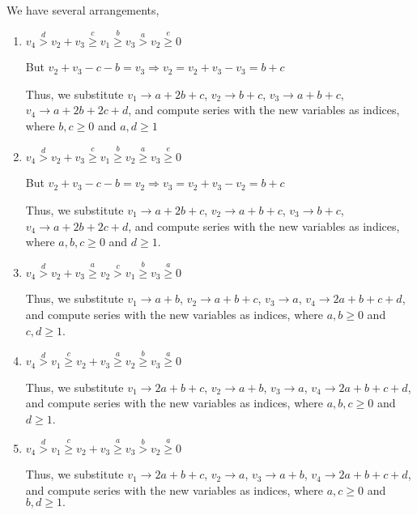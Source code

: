\documentclass{article}
\begin{document}
We have several arrangements,
\begin{enumerate}
\item 
$v_4\overset{d}{>}v_2+v_3\overset{c}{\geq}v_1\overset{b}{\geq}{v_3}\overset{a}{>}v_2\overset{e}{\geq}{0}$

But $v_2+v_3-c-b=v_3\Rightarrow{v_2=v_2+v_3-v_3=b+c}$

Thus, we substitute 
$v_1\rightarrow{a+2b+c}$, 
$v_2\rightarrow{b+c}$, 
$v_3\rightarrow{a+b+c}$, 
$v_4\rightarrow{a+2b+2c+d}$, and compute series with the new variables as indices, where $b,c\geq{0}$ and $a,d\geq{1}$

\item 
$v_4\overset{d}{>}v_2+v_3\overset{c}{\geq}v_1\overset{b}{\geq}{v_2}\overset{a}{\geq}v_3\overset{e}{\geq}{0}$

But $v_2+v_3-c-b=v_2\Rightarrow{v_3=v_2+v_3-v_2=b+c}$

Thus, we substitute 
$v_1\rightarrow{a+2b+c}$, 
$v_2\rightarrow{a+b+c}$, 
$v_3\rightarrow{b+c}$, 
$v_4\rightarrow{a+2b+2c+d}$, and compute series with the new variables as indices, where $a,b,c\geq{0}$ and $d\geq{1}$.
\item 
$v_4\overset{d}{>}v_2+v_3\overset{a}{\geq}v_2\overset{c}{>}{v_1}\overset{b}{\geq}v_3\overset{a}{\geq}{0}$


Thus, we substitute 
$v_1\rightarrow{a+b}$, 
$v_2\rightarrow{a+b+c}$, 
$v_3\rightarrow{a}$, 
$v_4\rightarrow{2a+b+c+d}$, and compute series with the new variables as indices, where $a,b\geq{0}$ and $c,d\geq{1}$.

\item 
$v_4\overset{d}{>}v_1\overset{c}{\geq}v_2+v_3\overset{a}{\geq}{v_2}\overset{b}{\geq}v_3\overset{a}{\geq}{0}$

Thus, we substitute 
$v_1\rightarrow{2a+b+c}$, 
$v_2\rightarrow{a+b}$, 
$v_3\rightarrow{a}$, 
$v_4\rightarrow{2a+b+c+d}$, and compute series with the new variables as indices, where $a,b,c\geq{0}$ and $d\geq{1}$.

\item 
$v_4\overset{d}{>}v_1\overset{c}{\geq}v_2+v_3\overset{a}{\geq}{v_3}\overset{b}{>}v_2\overset{a}{\geq}{0}$

Thus, we substitute 
$v_1\rightarrow{2a+b+c}$, 
$v_2\rightarrow{a}$, 
$v_3\rightarrow{a+b}$, 
$v_4\rightarrow{2a+b+c+d}$, and compute series with the new variables as indices, where $a,c\geq{0}$ and $b,d\geq{1}.$
\end{enumerate}
\end{document}

